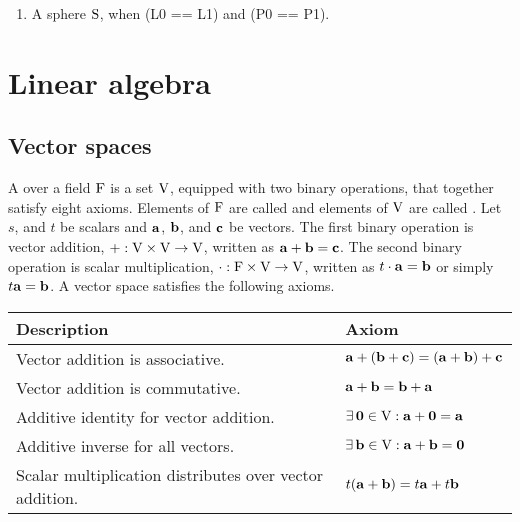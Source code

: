 \documentclass[oneside]{memoir}
\begin{document}
\begin{enumerate}
  \item A sphere $\mathrm{S}$, when (L0 == L1) and (P0 == P1).
\end{enumerate}


\backmatter

\appendix
\chapter{Linear algebra}
 
\section{Vector spaces}

\begin{definition} 
A  over a field $\mathrm{F}$ is a set $\mathrm{V}$, equipped
with two binary operations, that together satisfy eight axioms. Elements of 
$\mathrm{F}$ are called  and elements of $\mathrm{V}$ are called
. Let $s$, and $t$ be scalars and $\mathbf{a}$, $\mathbf{b}$,
and $\mathbf{c}$ be vectors. The first binary operation is vector addition, $+ :
\mathrm{V} \times \mathrm{V} \to \mathrm{V}$, written as $\mathbf{a} + \mathbf{b} =
\mathbf{c}$.
The second binary operation is scalar multiplication, $\cdot : \mathrm{F} \times
\mathrm{V} \to \mathrm{V}$, written as $t \cdot \mathbf{a} = \mathbf{b}$ or
simply $t\mathbf{a} = \mathbf{b}$. A vector space satisfies the following
axioms.

\vspace{1em}

\noindent\begin{tabularx}{\textwidth}{lX}
\toprule 
Description & Axiom \\  
\midrule
Vector addition is associative. & $\mathbf{a} + (\mathbf{b} + \mathbf{c}) =
(\mathbf{a} + \mathbf{b}) + \mathbf{c}$ \\

Vector addition is commutative. & $\mathbf{a} + \mathbf{b} = \mathbf{b} +
\mathbf{a}$ \\

Additive identity for vector addition. & $\exists \, \mathbf{0}
\in \mathrm{V} :
\mathbf{a}+\mathbf{0}=\mathbf{a}$\\

Additive inverse for all vectors. & $\exists \, \mathbf{b} \in
\mathrm{V} : \mathbf{a}+\mathbf{b} = \mathbf{0}$ \\

Scalar multiplication distributes over vector addition. & $t(\mathbf{a} +
\mathbf{b}) = t\mathbf{a} + t\mathbf{b}$ 
\\


\end{tabularx}
\end{definition}
\end{document}
